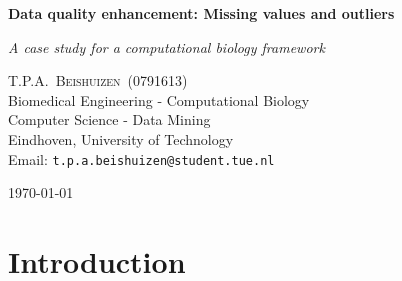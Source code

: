 \documentclass[10pt,a4paper]{article}
\newcommand{\documenttitle}{Data quality enhancement: Missing values and outliers}
\newcommand{\documentsubtitle}{A case study for a computational biology framework}
\begin{document}
	
	\begin{titlepage}
		
		\center
		
		\vspace*{3cm}
		
		\textbf{\huge \documenttitle}
		
		\textit{\LARGE \documentsubtitle}
		
		\vspace*{2cm}
		
		\large
		\centering
		T.P.A.~\textsc{Beishuizen}~(0791613)\\
		Biomedical Engineering - Computational Biology\\
		Computer Science - Data Mining\\
		Eindhoven, University of Technology\\
		Email: \texttt{t.p.a.beishuizen@student.tue.nl}
		
		\vfill
		
		\vspace*{1cm}
		
		\today
		
	\end{titlepage}
	
	\tableofcontents
	
	
	\pagestyle{fancy}
	\fancyhead{} %
	\fancyfoot{} %
	\renewcommand{\headrulewidth}{0.4pt}
	\renewcommand{\footrulewidth}{0.4pt}
	
	\fancyhead[L]{\rightmark}
	\fancyfoot[C]{\thepage}
	
	
	\clearpage
	
	\section{Introduction}
	\label{sec:Introduction}
	
\end{document}
